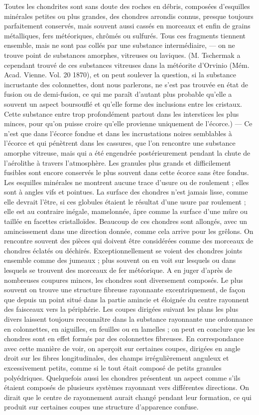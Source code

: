 \documentclass[a4paper, 12pt, oneside, french]{article}
\begin{document}
\og Toutes les chondrites sont sans doute des roches en débris, composées d'esquilles minérales petites ou plus grandes, des chondres arrondis connus, presque toujours parfaitement conservés, mais souvent aussi cassés en morceaux et enfin de grains métalliques, fers météoriques, chrômés ou sulfurés. Tous ces fragments tiennent ensemble, mais ne sont pas collés par une substance intermédiaire, --- on ne trouve point de substances amorphes, vitreuses ou laviques. \fg (M. Tschermak a cependant trouvé de ces substances vitreuses dans la météorite d'Orvinio (Mém. Acad. Vienne. Vol. 20 1870), et on peut soulever la question, si la substance incrustante des colonnettes, dont nous parlerons, ne s'est pas trouvée en état de fusion ou de demi-fusion, ce qui me paraît d'autant plus probable qu'elle a souvent un aspect boursouflé et qu'elle forme des inclusions entre les cristaux. Cette substance entre trop profondément partout dans les interstices les plus minces, pour qu'on puisse croire qu'elle provienne uniquement de l'écorce.) --- \og Ce n'est que dans l'écorce fondue et dans les incrustations noires semblables à l'écorce et qui pénètrent dans les cassures, que l'on rencontre une substance amorphe vitreuse, mais qui a été engendrée postérieurement pendant la chute de l'aérolithe à travers l'atmosphère. Les granules plus grands et difficilement fusibles sont encore conservés le plus souvent dans cette écorce sans être fondus. Les esquilles minérales ne montrent aucune trace d'usure ou de roulement ; elles sont à angles vifs et pointues. La surface des chondres n'est jamais lisse, comme elle devrait l'être, si ces globules étaient le résultat d'une usure par roulement ; elle est au contraire inégale, mamelonnée, âpre comme la surface d'une mûre ou taillée en facettes cristalloïdes. Beaucoup de ces chondres sont allongés, avec un amincissement dans une direction donnée, comme cela arrive pour les grêlons. On rencontre souvent des pièces qui doivent être considérées comme des morceaux de chondres éclatés ou déchirés. Exceptionnellement se voient des chondres joints ensemble comme des jumeaux ; plus souvent on en voit sur lesquels ou dans lesquels se trouvent des morceaux de fer météorique. A en juger d'après de nombreuses coupures minces, les chondres sont diversement composés. Le plus souvent on trouve une structure fibreuse rayonnante excentriquement, de façon que depuis un point situé dans la partie amincie et éloignée du centre rayonnent des faisceaux vers la périphérie. Les coupes dirigées suivant les plans les plus divers laissent toujours reconnaître dans la substance rayonnante une ordonnance en colonnettes, en aiguilles, en feuilles ou en lamelles ; on peut en conclure que les chondres sont en effet formés par des colonnettes fibreuses. En correspondance avec cette manière de voir, on aperçoit sur certaines coupes, dirigées en angle droit sur les fibres longitudinales, des champs irrégulièrement anguleux et excessivement petits, comme si le tout était composé de petits granules polyédriques. Quelquefois aussi les chondres présentent un aspect comme s'ils étaient composés de plusieurs systèmes rayonnant vers différentes directions. On dirait que le centre de rayonnement aurait changé pendant leur formation, ce qui produit sur certaines coupes une structure d'apparence confuse. 
\end{document}
